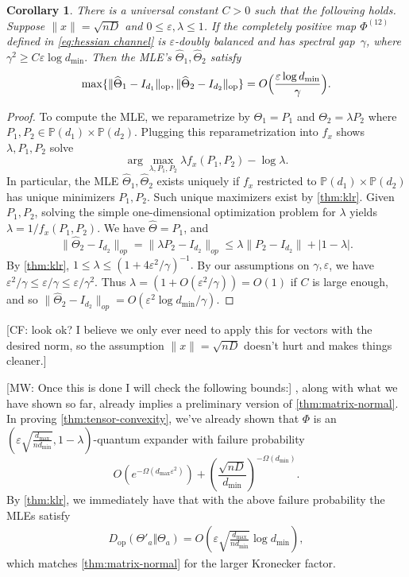 \documentclass[aos]{imsart}
\newtheorem{corollary}[theorem]{Corollary}
\theoremstyle{definition}
\numberwithin{equation}{section}
\DeclareMathOperator{\op}{op}
\DeclarePairedDelimiter{\norm}{\lVert}{\rVert}
\newcommand{\htheta}{\widehat{\Theta}}
\newcommand{\ot}{\otimes}
\newcommand{\eps}{\varepsilon}
\newcommand{\SPD}{\mathbb{P}}
\newcommand{\CF}[1]{{\color{purple}[CF: #1]}}
\newcommand{\MW}[1]{{\color{red}[MW: #1]}}
\begin{document}
\begin{corollary}
There is a universal constant $C>0$ such that the following holds. Suppose $\|x\| = \sqrt{nD}$ and $0 \leq \eps, \lambda \leq 1$. If the completely positive map $\Phi^{(12)}$ defined in \cref{eq:hessian channel} is $\eps$-doubly balanced and has spectral gap~$\gamma$, where $\gamma^2 \geq C \eps \log d_{\min}.$ Then the MLE's $\htheta_1, \htheta_2$ satisfy 
\begin{align*}
  \max \{ \norm{\htheta_1 - I_{d_1}}_{\op}, \norm{\htheta_2 - I_{d_2}}_{\op} \} = O\Bigl(\frac{\eps \log d_{\min}}\gamma\Bigr).
\end{align*}
\end{corollary}
\begin{proof}
To compute the MLE, we reparametrize by $\Theta_1 = P_1$ and $\Theta_2 = \lambda P_2$ where $P_1,P_2 \in \SPD(d_1) \times \SPD(d_2)$. Plugging this reparametrization into $f_x$ shows $\lambda, P_1, P_2$ solve
$$\arg\max_{\lambda, P_1, P_2} \lambda f_x(P_1, P_2) - \log \lambda.$$ 
In particular, the MLE $\htheta_1, \htheta_2$ exists uniquely if $f_x$ restricted to $\SPD(d_1) \times \SPD(d_2)$ has unique minimizers $P_1, P_2$. Such unique maximizers exist by \cref{thm:klr}. Given $P_1, P_2$, solving the simple one-dimensional optimization problem for $\lambda$ yields $\lambda = 1/f_x(P_1, P_2)$. We have $\htheta = P_1$, and 
$$ \|\htheta_2 - I_{d_2} \|_{op} = \|\lambda P_2  - I_{d_2} \|_{op} \leq \lambda \|P_2 - I_{d_2}\| + |1 - \lambda|.$$
By \cref{thm:klr}, $1 \leq \lambda \leq (1 + 4 \eps^2/\gamma)^{-1}.$ By our assumptions on $\gamma, \eps$, we have $\eps^2/\gamma \leq \eps/\gamma \leq \eps/\gamma^2$. Thus $\lambda = (1 + O(\eps^2/\gamma)) = O(1)$ if $C$ is large enough, and so
$\|\htheta_2 - I_{d_2} \|_{op} = O(\eps^2 \log d_{\min}/\gamma).$ \end{proof}

\CF{look ok? I believe we only ever need to apply this for vectors with the desired norm, so the assumption $\|x\| = \sqrt{nD}$ doesn't hurt and  makes things cleaner.}

\MW{Once this is done I will check the following bounds:}
{\color{red}, along with what we have shown so far, already implies a preliminary version of \cref{thm:matrix-normal}.
In proving \cref{thm:tensor-convexity}, we've already shown that $\Phi$ is an $(\eps \sqrt{\frac{d_{\max}}{n d_{\min}}}, 1 - \lambda)$-quantum expander with failure probability
\[ O(e^{ - \Omega( d_{\max} \eps^2)}) + \left( \frac{\sqrt{nD}}{d_{\min}} \right)^{ - \Omega(d_{\min})}. \]
By \cref{thm:klr}, we immediately have that with the above failure probability the MLEs satisfy
\begin{align*}
  D_{\op}(\Theta'_a \Vert \Theta_a) = O\left(\eps \sqrt{\frac{d_{\max}}{n d_{\min}}} \log d_{\min}\right),
\end{align*}
which matches \cref{thm:matrix-normal} for the larger Kronecker factor.}
\end{document}
